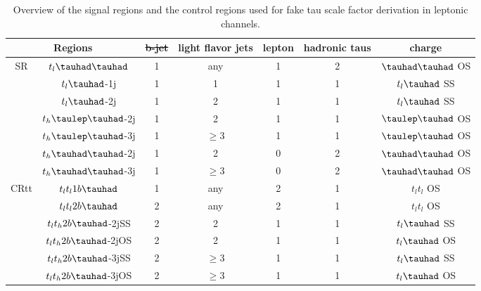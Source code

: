\documentclass[PAPER, coverpage, atlasdraft=true, texlive=2016, UKenglish]{\ATLASLATEXPATH atlasdoc}
\providecommand{\DIFadd}[1]{{\protect\color{blue}\uwave{#1}}} %
\providecommand{\DIFdel}[1]{{\protect\color{red}\sout{#1}}}                      %
\providecommand{\DIFaddFL}[1]{\DIFadd{#1}} %
\providecommand{\DIFdelFL}[1]{\DIFdel{#1}} %
\providecommand{\DIFaddbeginFL}{} %
\providecommand{\DIFaddendFL}{} %
\providecommand{\DIFdelbeginFL}{} %
\providecommand{\DIFdelendFL}{} %
\begin{document}
\begin{table}
\centering
\caption{Overview of the signal regions and the control regions used for fake tau scale factor derivation in leptonic channels.}
\label{tab:srcr}
\begin{tabular}[h]{c|c|c|c|c|c|c}
\hline \hline
\multicolumn{2}{c|}{Regions} & \DIFdelbeginFL \DIFdelFL{b-jet }\DIFdelendFL \DIFaddbeginFL \DIFaddFL{$b$-jet }\DIFaddendFL & light flavor jets        & lepton & hadronic taus & charge\\ \hline
\multirow{7}{*}{SR}&$t_l\thadhad$     & 1     & any                                & 1      & 2             & $\thadhad$ OS\\ \cline{2-7}
&$t_l\tauhad$-1j  & 1     & 1                                   & 1      & 1                     & $t_l\tauhad$ SS\\ \cline{2-7}
&$t_l\tauhad$-2j  & 1     & 2                                        & 1      & 1                     & $t_l\tauhad$ SS\\ \cline{2-7}
&$t_h\tlhad$-2j   & 1     & 2                           & 1      & 1             & $\tlhad$ OS\\ \cline{2-7}
&$t_h\tlhad$-3j   & 1     & $\ge3$                      & 1      & 1             & $\tlhad$ OS\\ \cline{2-7}
&$t_h\thadhad$-2j & 1     & 2                            & 0      & 2             & $\thadhad$ OS\\ \cline{2-7}
&$t_h\thadhad$-3j & 1     & $\ge3$                       & 0      & 2             & $\thadhad$ OS\\ \hline
\multirow{6}{*}{CRtt}&$t_lt_l1b\tauhad$ & 1     & any                           & 2      & 1                     & $t_lt_l$ OS\\ \cline{2-7}
&$t_lt_l2b\tauhad$      & 2     & any                           & 2      & 1                     & $t_lt_l$ OS\\ \cline{2-7}
&$t_lt_h2b\tauhad$-2jSS & 2     & 2                             & 1      & 1             & $t_l\tauhad$ SS\\ \cline{2-7}
&$t_lt_h2b\tauhad$-2jOS & 2     & 2                             & 1      & 1             & $t_l\tauhad$ OS\\ \cline{2-7}
&$t_lt_h2b\tauhad$-3jSS & 2     & $\ge3$                        & 1      & 1             & $t_l\tauhad$ SS\\ \cline{2-7}
&$t_lt_h2b\tauhad$-3jOS & 2     & $\ge3$                & 1      & 1             & $t_l\tauhad$ OS\\ \hline
\end{tabular}
\end{table}
\end{document}
